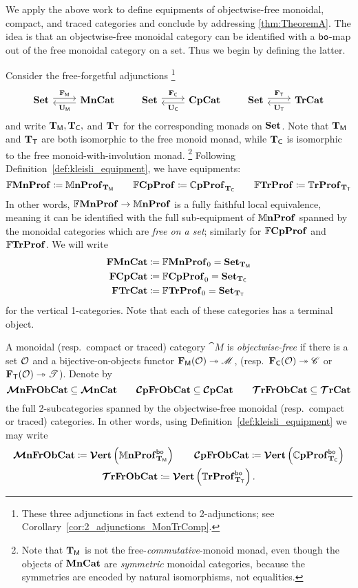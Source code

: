 \documentclass[11pt,oneside,article]{memoir}
\begin{document}
We apply the above work to define equipments of objectwise-free monoidal, compact, and traced categories and conclude by addressing \ref{thm:TheoremA}. The idea is that an objectwise-free monoidal category can be identified with a $\mathsf{bo}$-map out of the free monoidal category on a set. Thus we begin by defining the latter.

Consider the free-forgetful adjunctions%
\footnote{These three adjunctions in fact extend to 2-adjunctions; see Corollary~\ref{cor:2_adjunctions_MonTrComp}.}
\begin{equation}
   \label{eqn:adjunctions}
   \Adjoint{\Set}{\MonCat}{\FM}{\UM}
   \qquad
   \Adjoint{\Set}{\CompCat}{\FC}{\UC}
   \qquad
   \Adjoint{\Set}{\TrCat}{\FT}{\UT}
\end{equation}
and write $\mathbf{T}_{\mathsf{M}},\mathbf{T}_{\mathsf{C}},$ and $\mathbf{T}_{\mathsf{T}}$ for the corresponding monads on $\mathbf{Set}$. Note that $\mathbf{T}_{\mathsf{M}}$ and $\mathbf{T}_{\mathsf{T}}$ are both isomorphic to the free monoid monad, while $\mathbf{T}_{\mathsf{C}}$ is isomorphic to the free monoid-with-involution monad.%
\footnote{
   Note that $\mathbf{T}_{\mathsf{M}}$ is not the free-\emph{commutative}-monoid monad, even though the objects of
   $\mathbf{MnCat}$ are \emph{symmetric} monoidal categories, because the symmetries are encoded by natural
   isomorphisms, not equalities.
}
Following Definition~\ref{def:kleisli_equipment}, we have equipments:
\[
   \mathbb{F}\mathbf{MnProf}  \coloneqq \mathbb{M}\mathbf{nProf}_{\mathbf{T}_{\mathsf{M}}}
   \qquad
   \mathbb{F}\mathbf{CpProf} \coloneqq \mathbb{C}\mathbf{pProf}_{\mathbf{T}_{\mathsf{C}}}
   \qquad
   \mathbb{F}\mathbf{TrProf}   \coloneqq \mathbb{T}\mathbf{rProf}_{\mathbf{T}_{\mathsf{T}}} 
\]
In other words, $\mathbb{F}\mathbf{MnProf}\to\mathbb{M}\mathbf{nProf}$ is a fully faithful local equivalence, meaning it can be identified with the full sub-equipment of $\mathbb{M}\mathbf{nProf}$ spanned by the monoidal categories which are \emph{free on a set}; similarly for $\mathbb{F}\mathbf{CpProf}$ and $\mathbb{F}\mathbf{TrProf}$. We will write 
\begin{align*}
   \mathbf{FMnCat}&\coloneqq\mathbb{F}\mathbf{MnProf}_0=\mathbf{Set}_{\mathbf{T}_{\mathsf{M}}}\\
   \mathbf{FCpCat}&\coloneqq\mathbb{F}\mathbf{CpProf}_0=\mathbf{Set}_{\mathbf{T}_{\mathsf{C}}}\\
   \mathbf{FTrCat}&\coloneqq\mathbb{F}\mathbf{TrProf}_0=\mathbf{Set}_{\mathbf{T}_{\mathsf{T}}}
\end{align*}
for the vertical 1-categories. Note that each of these categories has a terminal object.

\begin{definition}
      \label{def:free_on_objects}
   A monoidal (resp.\ compact or traced) category $\cat{M}$ is \emph{objectwise-free} if there is a
   set $\mathcal{O}$ and a bijective-on-objects functor $\mathbf{F}_{\mathsf{M}}(\mathcal{O})\twoheadrightarrow\mathscr{M}$, (resp.\
   $\mathbf{F}_{\mathsf{C}}(\mathcal{O})\twoheadrightarrow\mathscr{C}$ or $\mathbf{F}_{\mathsf{T}}(\mathcal{O})\twoheadrightarrow\mathscr{T}$). Denote by
   \[
      \bm{\mathcal{M}}\mathbf{nFrObCat}\subseteq\bm{\mathcal{M}}\mathbf{nCat}\qquad\bm{\mathcal{C}}\mathbf{pFrObCat}\subseteq\bm{\mathcal{C}}\mathbf{pCat}\qquad\bm{\mathcal{T}}\mathbf{rFrObCat}\subseteq\bm{\mathcal{T}}\mathbf{rCat}
   \]
   the full 2-subcategories spanned by the objectwise-free monoidal (resp.\ compact or traced) categories. In other words, using Definition~\ref{def:kleisli_equipment} we may write
   \begin{gather*}
      \bm{\mathcal{M}}\mathbf{nFrObCat} \coloneqq \bm{\mathcal{V}}\mathbf{ert}\left(\mathbb{M}\mathbf{nProf}_{\mathbf{T}_{\mathsf{M}}}^{\mathsf{bo}}\right) \qquad
      \bm{\mathcal{C}}\mathbf{pFrObCat} \coloneqq \bm{\mathcal{V}}\mathbf{ert}\left(\mathbb{C}\mathbf{pProf}_{\mathbf{T}_{\mathsf{C}}}^{\mathsf{bo}}\right) \\
      \bm{\mathcal{T}}\mathbf{rFrObCat} \coloneqq \bm{\mathcal{V}}\mathbf{ert}\left(\mathbb{T}\mathbf{rProf}_{\mathbf{T}_{\mathsf{T}}}^{\mathsf{bo}}\right).
   \end{gather*}
\end{definition}
\end{document}
